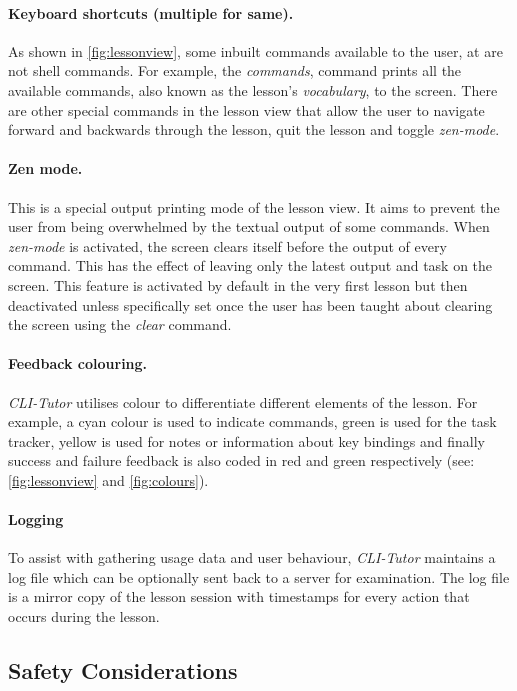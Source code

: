 \paragraph{Keyboard shortcuts (multiple for same).} As shown in
\autoref{fig:lessonview}, some inbuilt commands available to the user, at are
not shell commands. For example, the \textit{commands}, command prints all the
available commands, also known as the lesson's \textit{vocabulary}, to the
screen. There are other special commands in the lesson view that allow the user
to navigate forward and backwards through the lesson, quit the lesson and
toggle \textit{zen-mode}.

\paragraph{Zen mode.} This is a special output printing mode of the lesson
view. It aims to prevent the user from being overwhelmed by the textual output
of some commands. When \textit{zen-mode} is activated, the screen clears itself
before the output of every command. This has the effect of leaving only the
latest output and task on the screen. This feature is activated by default in
the very first lesson but then deactivated unless specifically set once the
user has been taught about clearing the screen using the \textit{clear}
command.

\paragraph{Feedback colouring.} \textit{CLI-Tutor} utilises colour to
differentiate different elements of the lesson. For example, a cyan colour is
used to indicate commands, green is used for the task tracker, yellow is used
for notes or information about key bindings and finally success and failure
feedback is also coded in red and green respectively (see:
\autoref{fig:lessonview} and \autoref{fig:colours}).

\paragraph{Logging} To assist with gathering usage data and user behaviour,
\textit{CLI-Tutor} maintains a log file which can be optionally sent back to a
server for examination. The log file is a mirror copy of the lesson session
with timestamps for every action that occurs during the lesson.

\subsection{Safety Considerations}

